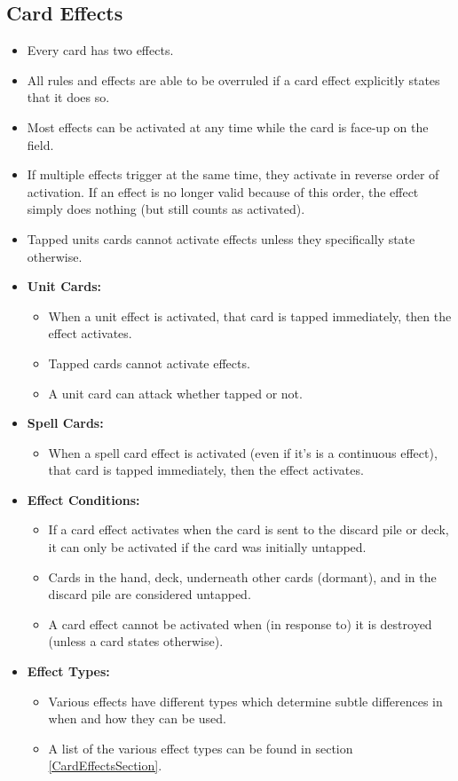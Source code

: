\subsection{Card Effects\label{CardEffectsRuleSection}}
\begin{itemize}
    \item Every card has two effects.
    \item All rules and effects are able to be overruled if a card effect explicitly states that it does so.
    \item Most effects can be activated at any time while the card is face-up on the field.
    \item If multiple effects trigger at the same time, they activate in reverse order of activation. If an effect is no longer valid because of this order, the effect simply does nothing (but still counts as activated).
    \item Tapped units cards cannot activate effects unless they specifically state otherwise.
    \item \textbf{Unit Cards:}
    \begin{itemize}
        \item When a unit effect is activated, that card is tapped immediately, then the effect activates.
        \item Tapped cards cannot activate effects.
        \item A unit card can attack whether tapped or not.
    \end{itemize}
    \item \textbf{Spell Cards:}
    \begin{itemize}
        \item When a spell card effect is activated (even if it's is a continuous effect), that card is tapped immediately, then the effect activates.
    \end{itemize}
    \item \textbf{Effect Conditions:}
    \begin{itemize}
        \item If a card effect activates when the card is sent to the discard pile or deck, it can only be activated if the card was initially untapped.
        \item Cards in the hand, deck, underneath other cards (dormant), and in the discard pile are considered untapped.
        \item A card effect cannot be activated when (in response to) it is destroyed (unless a card states otherwise).
    \end{itemize}
    \item \textbf{Effect Types:} 
    \begin{itemize}
        \item Various effects have different types which determine subtle differences in when and how they can be used.
        \item A list of the various effect types can be found in section \ref{CardEffectsSection}.
    \end{itemize}
\end{itemize}









